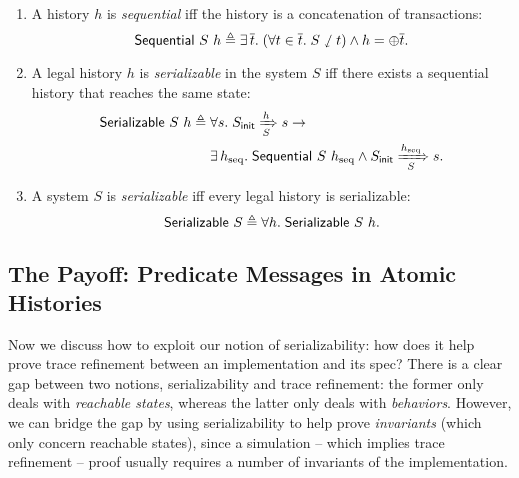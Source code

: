 \documentclass[sigplan,10pt,review,anonymous,screen]{acmart}\settopmatter{printfolios=true,printccs=false,printacmref=false}
\begin{document}
\begin{definition}\mbox{}\vspace{-8pt}\\
  \begin{enumerate}[leftmargin=*]
  \item A history $h$ is \emph{sequential} iff the history is a concatenation of transactions:
    \begin{displaymath}
      \mathsf{Sequential}\ S\ h \triangleq \exists\, \overline{t}.\; (\forall t \in \overline{t}.\; S \sswarrow t) \wedge h = \oplus \overline{t}.
    \end{displaymath}
  \item A legal history $h$ is \emph{serializable} in the system $S$ iff there exists a sequential history that reaches the same state:
    \begin{align*}
      \mathsf{Serializable}\ S\ h \triangleq\; & \forall s.\; S_{\textsf{init}} \xRightarrow[S]{h} s \to\\
      & \exists\, h_{\textrm{seq}}.\; \mathsf{Sequential}\ S\ h_{\textrm{seq}} \wedge S_{\textsf{init}} \xRightarrow[S]{h_{\textrm{seq}}} s.
    \end{align*}
  \item A system $S$ is \emph{serializable} iff every legal history is serializable:
    \begin{displaymath}
      \mathsf{Serializable}\ S \triangleq \forall h.\; \mathsf{Serializable}\ S\ h.
    \end{displaymath}
  \end{enumerate}
  \label{def-sz}
\end{definition}

\subsection{The Payoff: Predicate Messages in Atomic Histories}
\label{sec-pred-msg}

Now we discuss how to exploit our notion of serializability: how does it help prove trace refinement between an implementation and its spec?
There is a clear gap between two notions, serializability and trace refinement: the former only deals with \emph{reachable states}, whereas the latter only deals with \emph{behaviors}.
However, we can bridge the gap by using serializability to help prove \emph{invariants} (which only concern reachable states), since a simulation -- which implies trace refinement -- proof usually requires a number of invariants of the implementation.
\end{document}
